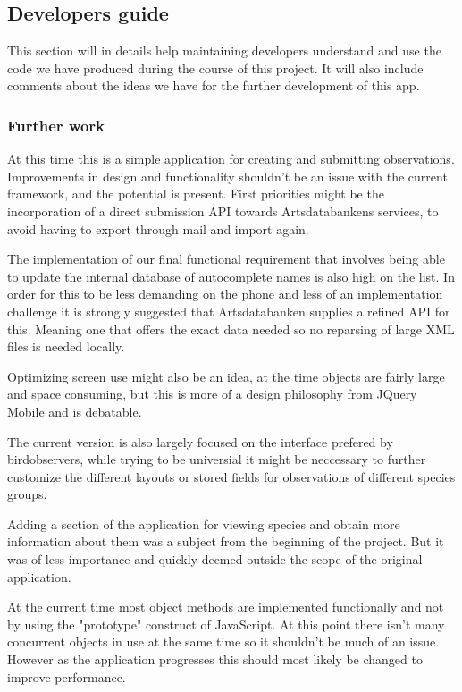 \subsection{Developers guide}

This section will in details help maintaining developers understand and use the
code we have produced during the course of this project. It will also include
comments about the ideas we have for the further development of this app.

\subsubsection{Further work}
At this time this is a simple application for creating and submitting
observations. Improvements in design and functionality shouldn't be an issue with the current framework,
and the potential is present. First priorities might be the incorporation of a
direct submission API towards Artsdatabankens services, to avoid having to
export through mail and import again. 

The implementation of our final functional requirement that involves being able to update
the internal database of autocomplete names is also high on the list. In order for this to be
less demanding on the phone and less of an implementation challenge it is strongly suggested 
that Artsdatabanken supplies a refined API for this.
Meaning one that offers the exact data needed so no reparsing of large XML files is needed locally.

Optimizing screen use might also be an
idea, at the time objects are fairly large and space consuming, but this is
more of a design philosophy from JQuery Mobile and is debatable.

The current version is also largely focused on the interface prefered by birdobservers, 
while trying to be universial it might be neccessary to further customize the different 
layouts or stored fields for observations of different species groups.

Adding a section of the application for viewing species and obtain more
information about them was a subject from the beginning of the project.  But it
was of less importance and quickly deemed outside the scope of the original
application.

At the current time most object methods are implemented functionally and not by
using the "prototype" construct of JavaScript.  At this point there isn't many
concurrent objects in use at the same time so it shouldn't be much of an issue.
However as the application progresses this should most likely be changed to
improve performance.

